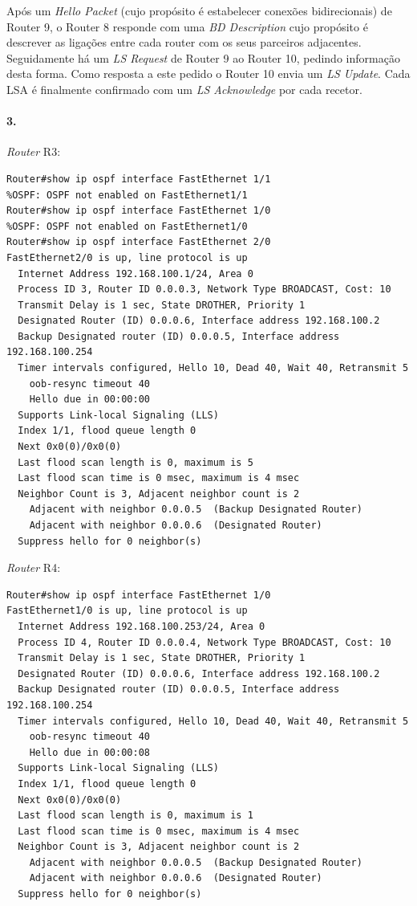 Após um \emph{Hello Packet} (cujo propósito é estabelecer conexões
bidirecionais) de Router 9, o Router 8 responde com uma \emph{BD
  Description} cujo propósito é descrever as ligações entre cada
router com os seus parceiros adjacentes. Seguidamente há um \emph{LS
  Request} de Router 9 ao Router 10, pedindo informação desta
forma. Como resposta a este pedido o Router 10 envia um \emph{LS
  Update}. Cada LSA é finalmente confirmado com um \emph{LS
  Acknowledge} por cada recetor.

\paragraph{3.}
\emph{Router} \textsf{R3}:
\begin{verbatim}
Router#show ip ospf interface FastEthernet 1/1
%OSPF: OSPF not enabled on FastEthernet1/1
Router#show ip ospf interface FastEthernet 1/0
%OSPF: OSPF not enabled on FastEthernet1/0
Router#show ip ospf interface FastEthernet 2/0
FastEthernet2/0 is up, line protocol is up 
  Internet Address 192.168.100.1/24, Area 0 
  Process ID 3, Router ID 0.0.0.3, Network Type BROADCAST, Cost: 10
  Transmit Delay is 1 sec, State DROTHER, Priority 1 
  Designated Router (ID) 0.0.0.6, Interface address 192.168.100.2
  Backup Designated router (ID) 0.0.0.5, Interface address 192.168.100.254
  Timer intervals configured, Hello 10, Dead 40, Wait 40, Retransmit 5
    oob-resync timeout 40
    Hello due in 00:00:00
  Supports Link-local Signaling (LLS)
  Index 1/1, flood queue length 0
  Next 0x0(0)/0x0(0)
  Last flood scan length is 0, maximum is 5
  Last flood scan time is 0 msec, maximum is 4 msec
  Neighbor Count is 3, Adjacent neighbor count is 2 
    Adjacent with neighbor 0.0.0.5  (Backup Designated Router)
    Adjacent with neighbor 0.0.0.6  (Designated Router)
  Suppress hello for 0 neighbor(s)
\end{verbatim}

\emph{Router} \textsf{R4}:
\begin{verbatim}
Router#show ip ospf interface FastEthernet 1/0
FastEthernet1/0 is up, line protocol is up 
  Internet Address 192.168.100.253/24, Area 0 
  Process ID 4, Router ID 0.0.0.4, Network Type BROADCAST, Cost: 10
  Transmit Delay is 1 sec, State DROTHER, Priority 1 
  Designated Router (ID) 0.0.0.6, Interface address 192.168.100.2
  Backup Designated router (ID) 0.0.0.5, Interface address 192.168.100.254
  Timer intervals configured, Hello 10, Dead 40, Wait 40, Retransmit 5
    oob-resync timeout 40
    Hello due in 00:00:08
  Supports Link-local Signaling (LLS)
  Index 1/1, flood queue length 0
  Next 0x0(0)/0x0(0)
  Last flood scan length is 0, maximum is 1
  Last flood scan time is 0 msec, maximum is 4 msec
  Neighbor Count is 3, Adjacent neighbor count is 2 
    Adjacent with neighbor 0.0.0.5  (Backup Designated Router)
    Adjacent with neighbor 0.0.0.6  (Designated Router)
  Suppress hello for 0 neighbor(s)
\end{verbatim}

